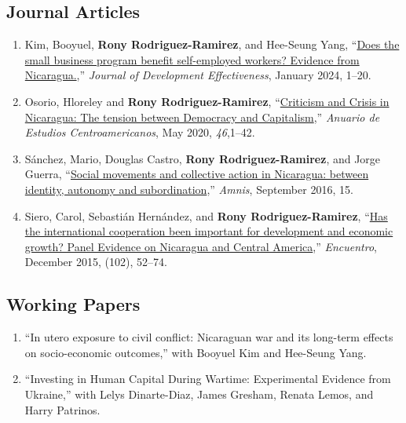 \documentclass[a4paper, 10pt]{article}
\begin{document}
\subsection*{Journal Articles}

\begin{enumerate}[leftmargin=10pt, label={}, itemindent=-10pt, nosep]
\item Kim, Booyuel, \textbf{Rony Rodriguez-Ramirez}, and Hee-Seung Yang, ``\href{https://www.tandfonline.com/doi/full/10.1080/19439342.2023.2300138}{Does the small business
program benefit self-employed workers? Evidence from Nicaragua.},''
\textit{Journal of Development Effectiveness}, January 2024, 1--20. 
\item Osorio, Hloreley and \textbf{Rony Rodriguez-Ramirez},
``\href{https://revistas.ucr.ac.cr/index.php/anuario/article/view/45081/44860}{Criticism
and Crisis in Nicaragua: The tension between Democracy and Capitalism},'' \emph{Anuario de Estudios Centroamericanos}, May 2020, \textit{46},1--42.
\item Sánchez, Mario, Douglas Castro, \textbf{Rony Rodriguez-Ramirez}, and Jorge
Guerra, ``\href{https://amnis.revues.org/2813}{Social movements and collective
action in Nicaragua: between identity, autonomy and subordination},'' \emph{Amnis}, September 2016, 15.

\item Siero, Carol, Sebastián Hernández, and \textbf{Rony Rodriguez-Ramirez},
``\href{http://www.uca.edu.ni/2/images/Revista-Encuentro/Revistas/e102/art-5.pdf}{Has
the international cooperation been important for development and economic
growth? Panel Evidence on Nicaragua and Central America},''
\emph{Encuentro}, December 2015, (102), 52--74.
\end{enumerate}

\subsection*{Working Papers}

\begin{enumerate}[leftmargin=10pt, label={}, itemindent=-10pt, nosep]
\item ``In utero exposure to civil conflict: Nicaraguan war and its long-term
effects on socio-economic outcomes,'' with Booyuel Kim and Hee-Seung Yang.
\item ``Investing in Human Capital During Wartime: Experimental Evidence from Ukraine,'' with Lelys
Dinarte-Diaz, James Gresham, Renata Lemos, and Harry Patrinos. 
\end{enumerate}
\end{document}

